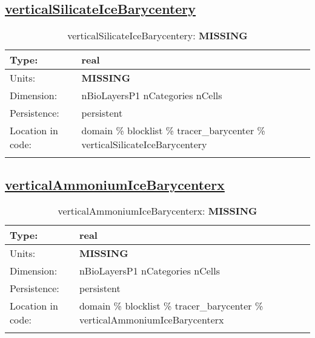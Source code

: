 \subsection[verticalSilicateIceBarycentery]{\hyperref[sec:var_tab_tracer_barycenter]{verticalSilicateIceBarycentery}}
\label{subsec:var_sec_tracer_barycenter_verticalSilicateIceBarycentery}
\begin{center}
\begin{longtable}{| p{2.0in} | p{4.0in} |}
        \hline 
        Type: & real \\
        \hline 
        Units: & {\bf \color{red} MISSING} \\
        \hline 
        Dimension: & nBioLayersP1 nCategories nCells \\
        \hline 
        Persistence: & persistent \\
        \hline 
         Location in code: & domain \% blocklist \% tracer\_barycenter \% verticalSilicateIceBarycentery \\
         \hline 
    \caption{verticalSilicateIceBarycentery: {\bf \color{red} MISSING}}
\end{longtable}
\end{center}
\subsection[verticalAmmoniumIceBarycenterx]{\hyperref[sec:var_tab_tracer_barycenter]{verticalAmmoniumIceBarycenterx}}
\label{subsec:var_sec_tracer_barycenter_verticalAmmoniumIceBarycenterx}
\begin{center}
\begin{longtable}{| p{2.0in} | p{4.0in} |}
        \hline 
        Type: & real \\
        \hline 
        Units: & {\bf \color{red} MISSING} \\
        \hline 
        Dimension: & nBioLayersP1 nCategories nCells \\
        \hline 
        Persistence: & persistent \\
        \hline 
         Location in code: & domain \% blocklist \% tracer\_barycenter \% verticalAmmoniumIceBarycenterx \\
         \hline 
    \caption{verticalAmmoniumIceBarycenterx: {\bf \color{red} MISSING}}
\end{longtable}
\end{center}
